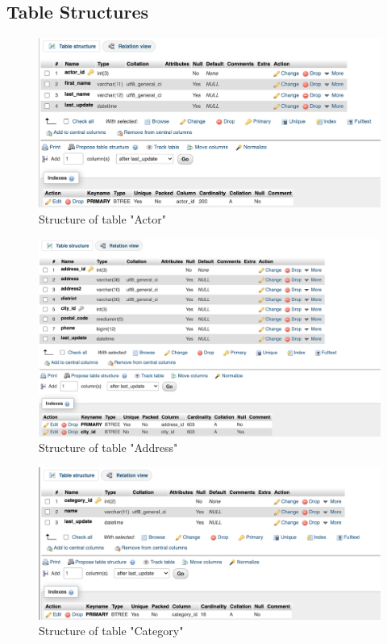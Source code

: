 \documentclass[openany]{article}
\begin{document}
\subsection{Table Structures}
	\begin{figure}[H]
		\includegraphics[width=\textwidth]{table_actor_struct}
		\caption{Structure of table "Actor"}	
	\end{figure}
	\begin{figure}[H]
		\includegraphics[width=\textwidth]{table_address_struct}
		\caption{Structure of table "Address"}	
	\end{figure}
	\begin{figure}[H]
		\includegraphics[width=\textwidth]{table_category_struct}
		\caption{Structure of table "Category"}	
	\end{figure}
\end{document}
